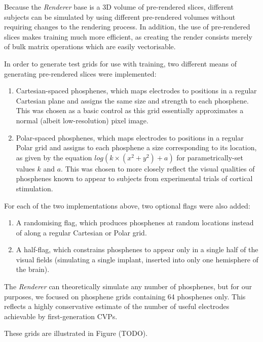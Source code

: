 \documentclass[a4paper,11pt,openany]{book}
\begin{document}
Because the \emph{Renderer} base is a 3D volume of pre-rendered slices, different subjects can be simulated by using different pre-rendered volumes without requiring changes to the rendering process.
In addition, the use of pre-rendered slices makes training much more efficient, as creating the render consists merely of bulk matrix operations which are easily vectorisable.

In order to generate test grids for use with training, two different means of generating pre-rendered slices were implemented:
\begin{enumerate}
\item Cartesian-spaced phosphenes, which maps electrodes to positions in a regular Cartesian plane and assigns the same size and strength to each phosphene.
This was chosen as a basic control as this grid essentially approximates a normal (albeit low-resolution) pixel image.
\item Polar-spaced phosphenes, which maps electrodes to positions in a regular Polar grid and assigns to each phosphene a size corresponding to its location, as given by the equation \(log(k \times (x^2 + y^2) + a)\) for parametrically-set values \(k\) and \(a\).
This was chosen to more closely reflect the visual qualities of phosphenes known to appear to subjects from experimental trials of cortical stimulation.
\end{enumerate}

For each of the two implementations above, two optional flags were also added:
\begin{enumerate}
\item A randomising flag, which produces phosphenes at random locations instead of along a regular Cartesian or Polar grid.
\item A half-flag, which constrains phosphenes to appear only in a single half of the visual fields (simulating a single implant, inserted into only one hemisphere of the brain).
\end{enumerate}

The \emph{Renderer} can theoretically simulate any number of phosphenes, but for our purposes, we focused on phosphene grids containing 64 phosphenes only.
This reflects a highly conservative estimate of the number of useful electrodes achievable by first-generation CVPs.


These grids are illustrated in Figure (TODO).
\end{document}
